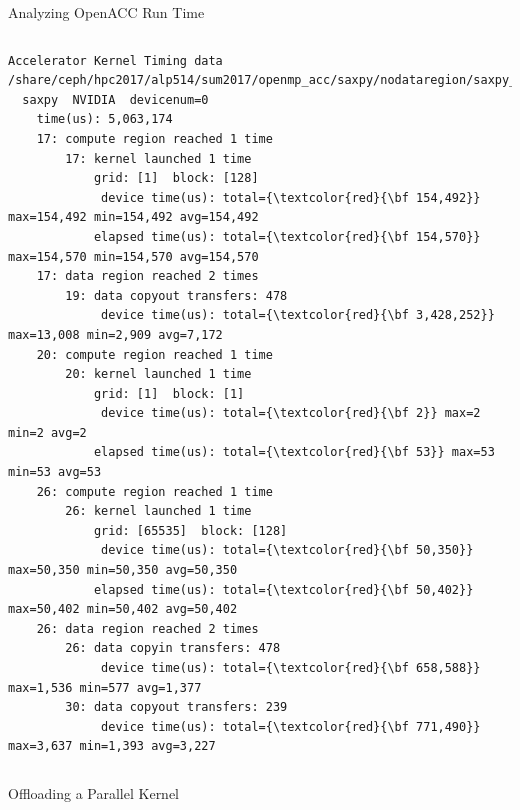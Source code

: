 \documentclass[10pt,t]{beamer}
\begin{document}
\begin{frame}[fragile]{Analyzing OpenACC Run Time}
\begin{block}{}
\begin{columns}[t]
\begin{Verbatim}[fontsize=\fontsize{3.5}{4.5}\selectfont,commandchars=\\\{\}]
Accelerator Kernel Timing data
/share/ceph/hpc2017/alp514/sum2017/openmp_acc/saxpy/nodataregion/saxpy_acc.f90
  saxpy  NVIDIA  devicenum=0
    time(us): 5,063,174
    17: compute region reached 1 time
        17: kernel launched 1 time
            grid: [1]  block: [128]
             device time(us): total={\textcolor{red}{\bf 154,492}} max=154,492 min=154,492 avg=154,492
            elapsed time(us): total={\textcolor{red}{\bf 154,570}} max=154,570 min=154,570 avg=154,570
    17: data region reached 2 times
        19: data copyout transfers: 478
             device time(us): total={\textcolor{red}{\bf 3,428,252}} max=13,008 min=2,909 avg=7,172
    20: compute region reached 1 time
        20: kernel launched 1 time
            grid: [1]  block: [1]
             device time(us): total={\textcolor{red}{\bf 2}} max=2 min=2 avg=2
            elapsed time(us): total={\textcolor{red}{\bf 53}} max=53 min=53 avg=53
    26: compute region reached 1 time
        26: kernel launched 1 time
            grid: [65535]  block: [128]
             device time(us): total={\textcolor{red}{\bf 50,350}} max=50,350 min=50,350 avg=50,350
            elapsed time(us): total={\textcolor{red}{\bf 50,402}} max=50,402 min=50,402 avg=50,402
    26: data region reached 2 times
        26: data copyin transfers: 478
             device time(us): total={\textcolor{red}{\bf 658,588}} max=1,536 min=577 avg=1,377
        30: data copyout transfers: 239
             device time(us): total={\textcolor{red}{\bf 771,490}} max=3,637 min=1,393 avg=3,227
    \end{Verbatim}
    \end{columns}
  \end{block}
\end{frame}

\begin{frame}{ Offloading a Parallel Kernel}
  
\end{frame}
\end{document}
